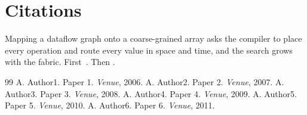 \documentclass{article}
\begin{document}
\section{Citations}
Mapping a dataflow graph onto a coarse-grained array asks the compiler to place every operation and route every value in space and time, and the search grows with the fabric. First~\citep{k01,k02,k03}. Then \citet{k04}.

\begin{thebibliography}{99}
 A. Author1. Paper 1. \emph{Venue}, 2006.
 A. Author2. Paper 2. \emph{Venue}, 2007.
 A. Author3. Paper 3. \emph{Venue}, 2008.
 A. Author4. Paper 4. \emph{Venue}, 2009.
 A. Author5. Paper 5. \emph{Venue}, 2010.
 A. Author6. Paper 6. \emph{Venue}, 2011.
\end{thebibliography}
\end{document}
